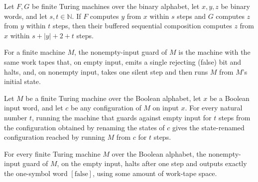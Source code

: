 \begin{lemma}
\label{Complexity.a3_comp_at}
\leanok
{}
Let $F,G$ be finite Turing machines over the binary alphabet, let $x,y,z$ be binary
words, and let $s,t\in\mathbb{N}$. If $F$ computes $y$ from $x$ within $s$ steps and $G$
computes $z$ from $y$ within $t$ steps, then their buffered sequential composition
computes $z$ from $x$ within $s+|y|+2+t$ steps.
\end{lemma}

\begin{definition}
\label{Complexity.a3NonemptyTM}
\leanok
{}
For a finite machine $M$, the nonempty-input guard of $M$ is the machine with the
same work tapes that, on empty input, emits a single rejecting (false) bit and
halts, and, on nonempty input, takes one silent step and then runs $M$ from $M$'s
initial state.
\end{definition}

\begin{lemma}
\label{Complexity.a3_nonempty_run}
\leanok
{}
Let $M$ be a finite Turing machine over the Boolean alphabet, let $x$ be a Boolean input
word, and let $c$ be any configuration of $M$ on input $x$. For every natural number
$t$, running the machine that guards against empty input for $t$ steps from the
configuration obtained by renaming the states of $c$ gives the state-renamed
configuration reached by running $M$ from $c$ for $t$ steps.
\end{lemma}

\begin{lemma}
\label{Complexity.a3_nonempty_nil}
\leanok
{}
For every finite Turing machine $M$ over the Boolean alphabet, the nonempty-input guard
of $M$, on the empty input, halts after one step and outputs exactly the one-symbol word
$[\mathrm{false}]$, using some amount of work-tape space.
\end{lemma}

